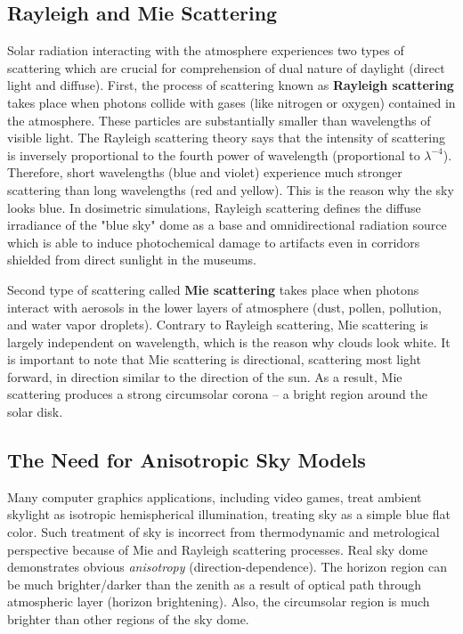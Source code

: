 \subsection{Rayleigh and Mie Scattering}
Solar radiation interacting with the atmosphere experiences two types of scattering which are crucial for comprehension of dual nature of daylight (direct light and diffuse). First, the process of scattering known as \textbf{Rayleigh scattering} \cite{strutt1871xv} takes place when photons collide with gases (like nitrogen or oxygen) contained in the atmosphere. These particles are substantially smaller than wavelengths of visible light. The Rayleigh scattering theory says that the intensity of scattering is inversely proportional to the fourth power of wavelength (proportional to $\lambda^{-4}$). Therefore, short wavelengths (blue and violet) experience much stronger scattering than long wavelengths (red and yellow). This is the reason why the sky looks blue. In dosimetric simulations, Rayleigh scattering defines the diffuse irradiance of the "blue sky" dome as a base and omnidirectional radiation source which is able to induce photochemical damage to artifacts even in corridors shielded from direct sunlight in the museums.

Second type of scattering called \textbf{Mie scattering} \cite{mie1908beitrage} takes place when photons interact with aerosols in the lower layers of atmosphere (dust, pollen, pollution, and water vapor droplets). Contrary to Rayleigh scattering, Mie scattering is largely independent on wavelength, which is the reason why clouds look white. It is important to note that Mie scattering is directional, scattering most light forward, in direction similar to the direction of the sun. As a result, Mie scattering produces a strong circumsolar corona – a bright region around the solar disk.

\subsection{The Need for Anisotropic Sky Models}
Many computer graphics applications, including video games, treat ambient skylight as isotropic hemispherical illumination, treating sky as a simple blue flat color. Such treatment of sky is incorrect from thermodynamic and metrological perspective because of Mie and Rayleigh scattering processes. Real sky dome demonstrates obvious \textit{anisotropy} (direction-dependence). The horizon region can be much brighter/darker than the zenith as a result of optical path through atmospheric layer (horizon brightening). Also, the circumsolar region is much brighter than other regions of the sky dome.

